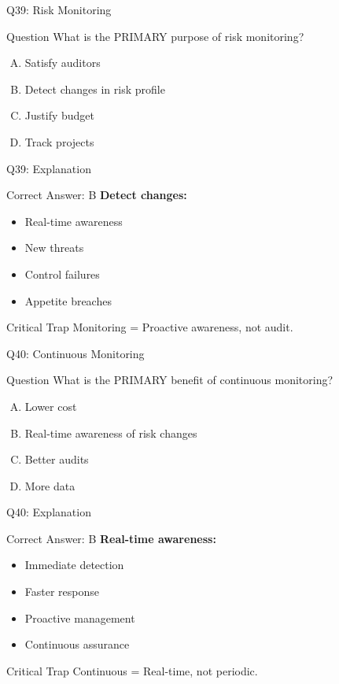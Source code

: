 \documentclass{beamer}
\begin{document}
			\begin{frame}{Q39: Risk Monitoring}
				\begin{block}{Question}
					What is the PRIMARY purpose of risk monitoring?
				\end{block}
				\begin{enumerate}[(A)]
					\item Satisfy auditors
					\item Detect changes in risk profile
					\item Justify budget
					\item Track projects
				\end{enumerate}
			\end{frame}
			
			\begin{frame}{Q39: Explanation}
				\begin{block}{Correct Answer: B}
					\textbf{Detect changes:}
					\begin{itemize}
						\item Real-time awareness
						\item New threats
						\item Control failures
						\item Appetite breaches
					\end{itemize}
				\end{block}
				\begin{alertblock}{Critical Trap}
					Monitoring = Proactive awareness, not audit.
				\end{alertblock}
			\end{frame}
			
			\begin{frame}{Q40: Continuous Monitoring}
				\begin{block}{Question}
					What is the PRIMARY benefit of continuous monitoring?
				\end{block}
				\begin{enumerate}[(A)]
					\item Lower cost
					\item Real-time awareness of risk changes
					\item Better audits
					\item More data
				\end{enumerate}
			\end{frame}
			
			\begin{frame}{Q40: Explanation}
				\begin{block}{Correct Answer: B}
					\textbf{Real-time awareness:}
					\begin{itemize}
						\item Immediate detection
						\item Faster response
						\item Proactive management
						\item Continuous assurance
					\end{itemize}
				\end{block}
				\begin{alertblock}{Critical Trap}
					Continuous = Real-time, not periodic.
				\end{alertblock}
			\end{frame}
			
\end{document}
